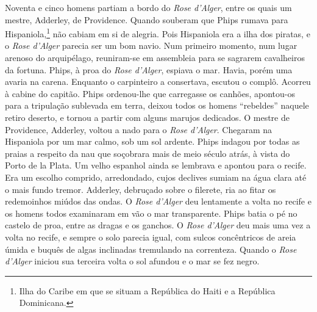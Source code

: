 Noventa e cinco homens partiam a bordo do \textit{Rose d’Alger}, entre os
quais um mestre, Adderley, de Providence. Quando souberam que Phips rumava
para Hispaniola,\footnote{ Ilha do Caribe em que se situam a República do
Haiti e a República Dominicana.} não cabiam em si de alegria.
Pois Hispaniola era a ilha dos piratas, e o \textit{Rose d’Alger} parecia
ser um bom navio. Num primeiro momento, num lugar arenoso do arquipélago,
reuniram-se em assembleia para se sagrarem cavalheiros da fortuna. Phips,
à proa do \textit{Rose d’Alger}, espiava o mar. Havia, porém uma avaria na
carena. Enquanto o carpinteiro a consertava, escutou o complô. Acorreu à
cabine do capitão. Phips ordenou-lhe que carregasse os canhões, apontou-os
para a tripulação sublevada em terra, deixou todos os homens “rebeldes”
naquele retiro deserto, e tornou a partir com alguns marujos dedicados. O
mestre de Providence, Adderley, voltou a nado para o \textit{Rose
d’Alger}. Chegaram na Hispaniola por um mar calmo, sob um sol ardente.
Phips indagou por todas as praias a respeito da nau que soçobrara mais de
meio século atrás, à vista do Porto de la Plata. Um velho espanhol ainda
se lembrava e apontou para o recife. Era um escolho comprido, arredondado,
cujos declives sumiam na água clara até o mais fundo tremor. Adderley,
debruçado sobre o filerete, ria ao fitar os redemoinhos miúdos das ondas.
O \textit{Rose d’Alger} deu lentamente a volta no recife e os homens todos
examinaram em vão o mar transparente. Phips batia o pé no castelo de proa,
entre as dragas e os ganchos. O \textit{Rose d’Alger} deu mais uma vez a
volta no recife, e sempre o solo parecia igual, com sulcos concêntricos de
areia úmida e buquês de algas inclinadas tremulando na correnteza. Quando
o \textit{Rose d’Alger} iniciou sua terceira volta o sol afundou e o mar
se fez negro.

